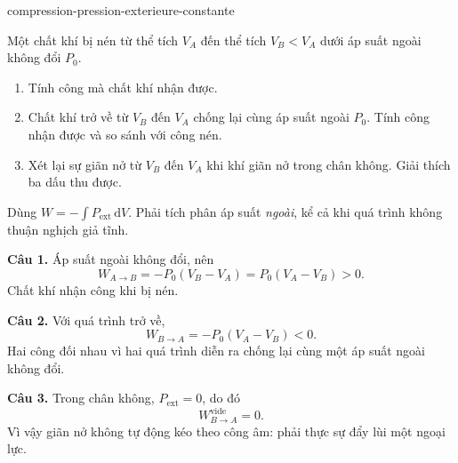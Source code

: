 \begin{exo}{compression-pression-exterieure-constante}

Một chất khí bị nén từ thể tích $V_A$ đến thể tích $V_B<V_A$ dưới áp suất ngoài không đổi $P_0$.

\begin{enumerate}
\item Tính công mà chất khí nhận được.
\item Chất khí trở về từ $V_B$ đến $V_A$ chống lại cùng áp suất ngoài $P_0$. Tính công nhận được và so sánh với công nén.
\item Xét lại sự giãn nở từ $V_B$ đến $V_A$ khi khí giãn nở trong chân không. Giải thích ba dấu thu được.
\end{enumerate}

\begin{indication}
Dùng $W=-\int P_{\mathrm{ext}}\,\mathrm{d}V$. Phải tích phân áp suất \emph{ngoài},
kể cả khi quá trình không thuận nghịch giả tĩnh.
\end{indication}

\begin{solution}
\textbf{Câu 1.} Áp suất ngoài không đổi, nên
\[
W_{A\to B}=-P_0(V_B-V_A)=P_0(V_A-V_B)>0.
\]
Chất khí nhận công khi bị nén.

\textbf{Câu 2.} Với quá trình trở về,
\[
W_{B\to A}=-P_0(V_A-V_B)<0.
\]
Hai công đối nhau vì hai quá trình diễn ra chống lại cùng một áp suất ngoài không đổi.

\textbf{Câu 3.} Trong chân không, $P_{\mathrm{ext}}=0$, do đó
\[
W_{B\to A}^{\mathrm{vide}}=0.
\]
Vì vậy giãn nở không tự động kéo theo công âm: phải thực sự đẩy lùi một ngoại lực.
\end{solution}
\end{exo}
